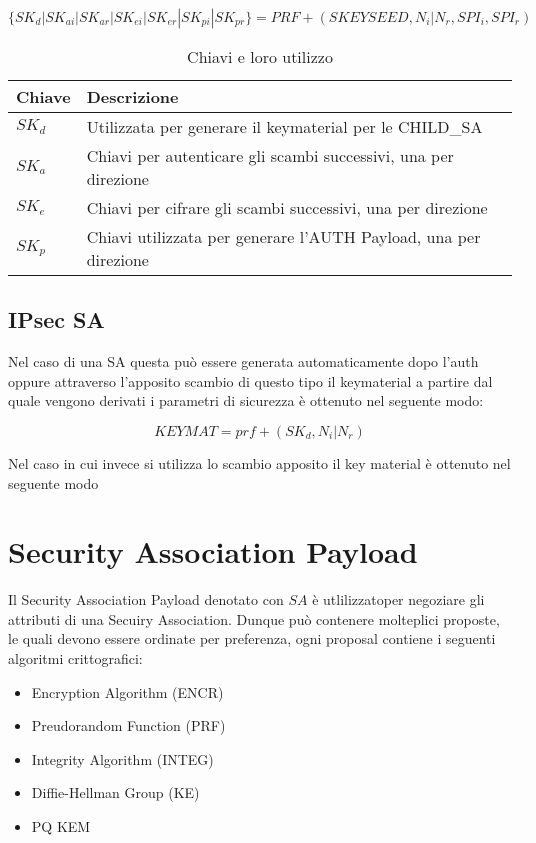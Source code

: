 $$\{SK_{d} | SK_{ai} | SK_{ar} | SK_{ei} | SK_{er} | SK_{pi} | SK_{pr} \} = PRF+(SKEYSEED, N_i|N_r, SPI_i, SPI_r)$$

\begin{table}[htbp]
    \centering
    \begin{tabular}{ll}
        \toprule
        \textbf{Chiave} & \textbf{Descrizione} \\
        \midrule
        $SK_d$ & Utilizzata per generare il keymaterial per le CHILD\_SA \\
        $SK_{a}$ & Chiavi per autenticare gli scambi successivi, una per direzione \\
        $SK_{e}$ & Chiavi per cifrare gli scambi successivi, una per direzione \\
        $SK_{p}$ & Chiavi utilizzata per generare l'AUTH Payload, una per direzione \\
        \bottomrule
    \end{tabular}
    \caption{Chiavi e loro utilizzo}
\end{table}

\subsection{IPsec SA}

Nel caso di una SA questa può essere generata automaticamente dopo l'auth oppure attraverso l'apposito scambio di questo tipo il keymaterial a partire dal quale vengono derivati i parametri di sicurezza è ottenuto nel seguente modo:

$$KEYMAT=prf+(SK_d,  N_i|N_r)$$

Nel caso in cui invece si utilizza lo scambio apposito il key material è ottenuto nel seguente modo


\section{Security Association Payload}

Il Security Association Payload denotato con $SA$ è utlilizzatoper negoziare gli attributi di una Secuiry Association. 
Dunque può contenere molteplici proposte, le quali devono essere ordinate per preferenza, ogni proposal contiene i seguenti algoritmi crittografici:

\begin{itemize}
    \item Encryption Algorithm (ENCR)
    \item Preudorandom Function (PRF)
    \item Integrity Algorithm (INTEG)
    \item Diffie-Hellman Group (KE)
    \item PQ KEM 
\end{itemize}



